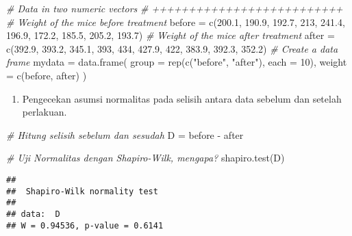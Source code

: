 \documentclass[
]{book}
\newenvironment{Shaded}{\begin{snugshade}}{\end{snugshade}}
\newcommand{\AttributeTok}[1]{\textcolor[rgb]{0.77,0.63,0.00}{#1}}
\newcommand{\CommentTok}[1]{\textcolor[rgb]{0.56,0.35,0.01}{\textit{#1}}}
\newcommand{\DecValTok}[1]{\textcolor[rgb]{0.00,0.00,0.81}{#1}}
\newcommand{\FloatTok}[1]{\textcolor[rgb]{0.00,0.00,0.81}{#1}}
\newcommand{\FunctionTok}[1]{\textcolor[rgb]{0.00,0.00,0.00}{#1}}
\newcommand{\NormalTok}[1]{#1}
\newcommand{\OtherTok}[1]{\textcolor[rgb]{0.56,0.35,0.01}{#1}}
\newcommand{\SpecialCharTok}[1]{\textcolor[rgb]{0.00,0.00,0.00}{#1}}
\newcommand{\StringTok}[1]{\textcolor[rgb]{0.31,0.60,0.02}{#1}}
\providecommand{\tightlist}{%
  \setlength{\itemsep}{0pt}\setlength{\parskip}{0pt}}
\begin{document}
\begin{Shaded}
\begin{Highlighting}[]
\CommentTok{\# Data in two numeric vectors}
\CommentTok{\# ++++++++++++++++++++++++++}
\CommentTok{\# Weight of the mice before treatment}
\NormalTok{before }\OtherTok{=} \FunctionTok{c}\NormalTok{(}\FloatTok{200.1}\NormalTok{, }\FloatTok{190.9}\NormalTok{, }\FloatTok{192.7}\NormalTok{, }\DecValTok{213}\NormalTok{, }\FloatTok{241.4}\NormalTok{, }\FloatTok{196.9}\NormalTok{, }\FloatTok{172.2}\NormalTok{, }\FloatTok{185.5}\NormalTok{, }\FloatTok{205.2}\NormalTok{, }\FloatTok{193.7}\NormalTok{)}
\CommentTok{\# Weight of the mice after treatment}
\NormalTok{after }\OtherTok{=} \FunctionTok{c}\NormalTok{(}\FloatTok{392.9}\NormalTok{, }\FloatTok{393.2}\NormalTok{, }\FloatTok{345.1}\NormalTok{, }\DecValTok{393}\NormalTok{, }\DecValTok{434}\NormalTok{, }\FloatTok{427.9}\NormalTok{, }\DecValTok{422}\NormalTok{, }\FloatTok{383.9}\NormalTok{, }\FloatTok{392.3}\NormalTok{, }\FloatTok{352.2}\NormalTok{)}
\CommentTok{\# Create a data frame}
\NormalTok{mydata }\OtherTok{=} \FunctionTok{data.frame}\NormalTok{( }
                \AttributeTok{group =} \FunctionTok{rep}\NormalTok{(}\FunctionTok{c}\NormalTok{(}\StringTok{"before"}\NormalTok{, }\StringTok{"after"}\NormalTok{), }\AttributeTok{each =} \DecValTok{10}\NormalTok{),}
                \AttributeTok{weight =} \FunctionTok{c}\NormalTok{(before,  after)}
\NormalTok{                )}
\end{Highlighting}
\end{Shaded}

\begin{enumerate}
\def\labelenumi{\arabic{enumi}.}
\setcounter{enumi}{1}
\tightlist
\item
  Pengecekan asumsi normalitas pada selisih antara data sebelum dan setelah perlakuan.
\end{enumerate}

\begin{Shaded}
\begin{Highlighting}[]
\CommentTok{\# Hitung selisih sebelum dan sesudah}
\NormalTok{D }\OtherTok{=}\NormalTok{ before }\SpecialCharTok{{-}}\NormalTok{ after}

\CommentTok{\# Uji Normalitas dengan Shapiro{-}Wilk, mengapa?}
\FunctionTok{shapiro.test}\NormalTok{(D)}
\end{Highlighting}
\end{Shaded}

\begin{verbatim}
## 
##  Shapiro-Wilk normality test
## 
## data:  D
## W = 0.94536, p-value = 0.6141
\end{verbatim}
\end{document}
